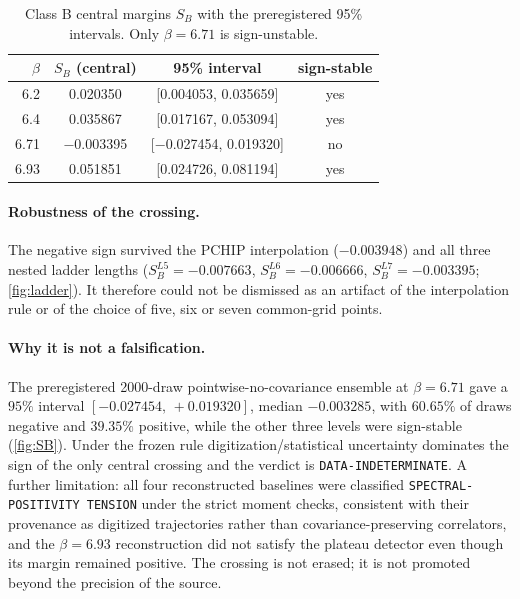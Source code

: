 \documentclass[11pt,a4paper]{article}
\theoremstyle{definition}
\theoremstyle{remark}
\begin{document}
\begin{table}[t]\centering\small\caption{Class B central margins $S_B$ with the preregistered 95\% intervals. Only $\beta=6.71$ is sign-unstable.}\label{tab:sbmain}
\begin{tabular}{@{}rccc@{}}\toprule $\beta$ & $S_B$ (central) & 95\% interval & sign-stable\\\midrule
6.2 & 0.020350 & [0.004053, 0.035659] & yes\\
6.4 & 0.035867 & [0.017167, 0.053094] & yes\\
6.71 & $-$0.003395 & [$-$0.027454, 0.019320] & no\\
6.93 & 0.051851 & [0.024726, 0.081194] & yes\\
\bottomrule\end{tabular}\end{table}



\paragraph{Robustness of the crossing.} The negative sign survived the PCHIP interpolation ($-0.003948$) and all three nested ladder lengths ($S_B^{L5}=-0.007663$, $S_B^{L6}=-0.006666$, $S_B^{L7}=-0.003395$; \cref{fig:ladder}). It therefore could not be dismissed as an artifact of the interpolation rule or of the choice of five, six or seven common-grid points.

\paragraph{Why it is not a falsification.} The preregistered 2000-draw pointwise-no-covariance ensemble at $\beta=6.71$ gave a $95\%$ interval $[-0.027454,\,+0.019320]$, median $-0.003285$, with $60.65\%$ of draws negative and $39.35\%$ positive, while the other three levels were sign-stable (\cref{fig:SB}). Under the frozen rule digitization/statistical uncertainty dominates the sign of the only central crossing and the verdict is \texttt{DATA-\allowbreak{}INDETERMINATE}. A further limitation: all four reconstructed baselines were classified \texttt{SPECTRAL-\allowbreak{}POSITIVITY TENSION} under the strict moment checks, consistent with their provenance as digitized trajectories rather than covariance-preserving correlators, and the $\beta=6.93$ reconstruction did not satisfy the plateau detector even though its margin remained positive. The crossing is not erased; it is not promoted beyond the precision of the source.
\end{document}
